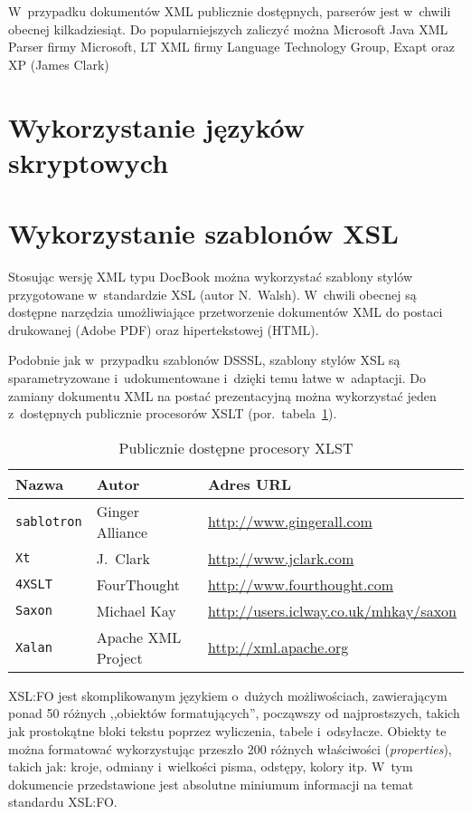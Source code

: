 \documentclass[document]{xmgr}
\begin{document}
W~przypadku dokumentów XML publicznie dostępnych, parserów jest
w~chwili obecnej kilkadziesiąt. Do popularniejszych zaliczyć można
Microsoft Java XML Parser firmy Microsoft, LT XML firmy Language
Technology Group, Exapt oraz XP (James Clark)

\section{Wykorzystanie języków skryptowych}

\section{Wykorzystanie szablonów XSL}

Stosując wersję XML typu DocBook można wykorzystać szablony stylów
przygotowane w~standardzie XSL (autor N.~Walsh). W~chwili obecnej
są dostępne narzędzia umożliwiające przetworzenie dokumentów XML do
postaci drukowanej (Adobe PDF) oraz hipertekstowej (HTML).

Podobnie jak w~przypadku szablonów DSSSL, szablony stylów XSL są
sparametryzowane i~udokumentowane i~dzięki temu łatwe w~adaptacji. Do
zamiany dokumentu XML na postać prezentacyjną można wykorzystać jeden
z~dostępnych publicznie procesorów XSLT
(por.~tabela~\ref{zest:proces:xslt}).

\begin{table}[!htb]
\begin{tabular}{|l|l|l|} \hline
Nazwa & Autor      & Adres URL \\ \hline
\texttt{sablotron} & Ginger Alliance & \url{http://www.gingerall.com} \\ \hline
\texttt{Xt}        & J.~Clark & \url{http://www.jclark.com} \\ \hline
\texttt{4XSLT}     & FourThought & \url{http://www.fourthought.com} \\ \hline
\texttt{Saxon}     & Michael Kay &  \url{http://users.iclway.co.uk/mhkay/saxon} \\ \hline
\texttt{Xalan}     & Apache XML Project & \url{http://xml.apache.org} \\ \hline
\end{tabular}
\caption{Publicznie dostępne procesory XLST\label{zest:proces:xslt}}
\end{table}

XSL:FO jest skomplikowanym językiem o~dużych możliwościach,
zawierającym ponad 50 różnych ,,obiektów formatujących'', począwszy od
najprostszych, takich jak prostokątne bloki tekstu poprzez wyliczenia,
tabele i~odsyłacze. Obiekty te można formatować wykorzystując przeszło
200 różnych właściwości (\emph{properties\/}), takich jak: kroje,
odmiany i~wielkości pisma, odstępy, kolory itp.
W~tym dokumencie przedstawione jest absolutne miniumum informacji
na temat standardu XSL:FO.
\end{document}
